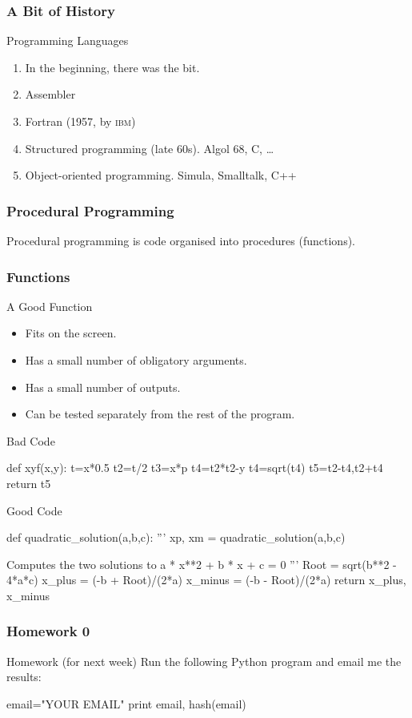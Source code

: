 \begin{frame}[fragile]
\frametitle{A Bit of History}

\begin{block}{Programming Languages}
\begin{enumerate}
\item In the beginning, there was the bit.
\item Assembler
\item Fortran (1957, by \textsc{ibm})
\item Structured programming (late 60s). Algol 68, C, \ldots
\item Object-oriented programming. Simula, Smalltalk, C++ %
\end{enumerate}
\end{block}
\end{frame}

\begin{frame}[fragile]
\frametitle{Procedural Programming}
Procedural programming is code organised into procedures (functions).
\end{frame}

\begin{frame}[fragile]
\frametitle{Functions}
\begin{block}{A Good Function}
\begin{itemize}
\item Fits on the screen.
\item Has a small number of obligatory arguments.
\item Has a small number of outputs.
\item Can be tested separately from the rest of the program.
\end{itemize}
\end{block}
\end{frame}


\begin{frame}[fragile]
\begin{block}{Bad Code}
\begin{python}
def xyf(x,y):
    t=x*0.5
    t2=t/2
    t3=x*p
    t4=t2*t2-y
    t4=sqrt(t4)
    t5=t2-t4,t2+t4
    return t5

\end{python}
\end{block}

\begin{block}{Good Code}
\begin{python}
def quadratic_solution(a,b,c):
    '''
    xp, xm = quadratic_solution(a,b,c)

    Computes the two solutions to
        a * x**2 + b * x + c = 0
    '''
    Root = sqrt(b**2 - 4*a*c)
    x_plus = (-b + Root)/(2*a)
    x_minus = (-b - Root)/(2*a)
    return x_plus, x_minus

\end{python}

\end{block}
\end{frame}

\begin{frame}[fragile]
\frametitle{Homework 0}

\begin{block}{Homework (for next week)}
Run the following Python program and email me the results:
\begin{python}
email="YOUR EMAIL"
print email, hash(email)
\end{python}
\end{block}
\end{frame}


